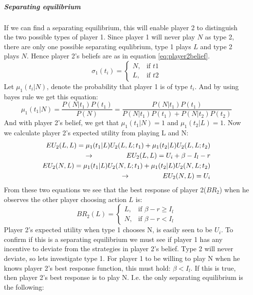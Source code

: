 \subparagraph{Separating equilibrium}
If we can find a separating equilibrium, this will enable player 2 to distinguish the two possible types of player 1.
Since player 1 will never play $N$ as type 2, there are only one possible separating equlibrium, type 1 plays $L$ and type 2 plays $N$. Hence player 2's beliefs are as in equation \ref{eq:player2belief}.
\begin{equation}
    \sigma_{1}(t_{i})= 
\begin{cases}
   N,& \text{if } t1\\
   L,& \text{if } t2  
\end{cases}
\label{eq:player2belief}
\end{equation}
Let $\mu_{1}(t_{i} | N )$, denote the probability that player 1 is of type $t_{i}$. And by using bayes rule we get this equation:
\begin{equation}
\mu_{1}(t_{1} | N )=\frac{P(N|t_{1})P(t_{1})}{P(N)}=\frac{P(N|t_{1})P(t_{1})}{P(N|t_{1})P(t_{1})+P(N|t_{2})P(t_{2})}
\end{equation}
And with player 2's belief, we get that $\mu_{1}(t_{1} | N )=1$ and $\mu_{1}(t_{2} | L )= 1 $. Now we calculate player 2's expected utility from playing L and N:
\begin{eqnarray}
EU_{2}(L,L)=\mu_{1}(t_{1} | L )U_{2}(L,L;t_{1})+\mu_{1}(t_{2} | L )U_{2}(L,L;t_{2}) \nonumber\\
\llap{$\rightarrow$\hspace{50pt}}EU_{2}(L,L)=U_{i}+\beta-I_{l}-r \\
EU_{2}(N,L)=\mu_{1}(t_{1} | L )U_{2}(N,L;t_{1})+\mu_{1}(t_{2} | L )U_{2}(N,L;t_{2})\nonumber\\
\llap{$\rightarrow$\hspace{50pt}}EU_{2}(N,L)=U_{i}
\end{eqnarray}
From these two equations we see that the best response of player 2($BR_2$) when he observes the other player choosing action $L$ is:
\begin{equation}
BR_{2}(L)=
\begin{cases}
L, & \text{if }\beta - r \geq I_{l}\\
N, & \text{if } \beta -r<I_{l}
\end{cases}
\label{eq:insuredBR}
\end{equation}
Player 2's expected utility when type 1 chooses N, is easily seen to be $U_{i}$. 
To confirm if this is a separating equilibrium we must see if player 1 has any incentive to deviate from the strategies in player 2's belief.
Type 2 will never deviate, so lets investigate type 1.
For player 1 to be willing to play N when he knows player 2's best response function, this must hold: $\beta<I_{l}$. If this is true, then player 2's best response is to play N. I.e. the only separating equilibrium is the following:

